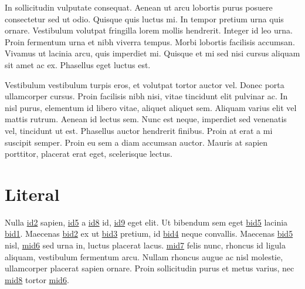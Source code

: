 \sphinxAtStartPar
In sollicitudin vulputate consequat. Aenean ut arcu lobortis purus posuere consectetur sed ut odio.
Quisque quis luctus mi. In tempor pretium urna quis ornare. Vestibulum volutpat fringilla lorem
mollis hendrerit. Integer id leo urna. Proin fermentum urna et nibh viverra tempus. Morbi lobortis
facilisis accumsan. Vivamus ut lacinia arcu, quis imperdiet mi. Quisque et mi sed nisi cursus
aliquam sit amet ac ex. Phasellus eget luctus est.

\sphinxAtStartPar
Vestibulum vestibulum turpis eros, et volutpat tortor auctor vel. Donec porta ullamcorper cursus.
Proin facilisis nibh nisi, vitae tincidunt elit pulvinar ac. In nisl purus, elementum id libero
vitae, aliquet aliquet sem. Aliquam varius elit vel mattis rutrum. Aenean id lectus sem. Nunc est
neque, imperdiet sed venenatis vel, tincidunt ut est. Phasellus auctor hendrerit finibus. Proin at
erat a mi suscipit semper. Proin eu sem a diam accumsan auctor. Mauris at sapien porttitor, placerat
erat eget, scelerisque lectus.


\section{Literal}
\label{\detokenize{test:literal}}\begin{sphinxalltt}
Nulla \hyperlink{\detokenize{id2}}{id2} sapien, \hyperlink{\detokenize{id5}}{id5} a
\hyperlink{\detokenize{id8}}{id8} id, \hyperlink{\detokenize{id9}}{id9} eget elit. \hypertarget{\detokenize{id10}}{Ut}
bibendum sem eget \hyperlink{\detokenize{bid5-ref32}}{\hypertarget{\detokenize{bid5}}{bid5}} lacinia \hyperlink{\detokenize{bid1}}{\hypertarget{\detokenize{bid1-ref28}}{bid1}}. Maecenas
\hyperlink{\detokenize{bid2}}{\hypertarget{\detokenize{bid2-ref29}}{bid2}} ex
ut \hyperlink{\detokenize{bid3}}{\hypertarget{\detokenize{bid3-ref30}}{bid3}} pretium, id \hyperlink{\detokenize{bid4}}{\hypertarget{\detokenize{bid4-ref31}}{bid4}} neque convallis. Maecenas
\hyperlink{\detokenize{bid5}}{\hypertarget{\detokenize{bid5-ref32}}{bid5}} nisl, \hyperlink{\detokenize{test-mid6-id1}}{\hypertarget{\detokenize{test-mid6-id0}}{mid6}} sed urna in, luctus placerat
lacus. \hyperlink{\detokenize{test-mid7-id0}}{\hypertarget{\detokenize{test-mid7-id1}}{mid7}} felis nunc, rhoncus id ligula aliquam, vestibulum fermentum arcu. Nullam rhoncus augue
ac nisl molestie, ullamcorper placerat sapien ornare. Proin sollicitudin purus et metus varius, nec
\hyperlink{\detokenize{test-mid8-id1}}{\hypertarget{\detokenize{test-mid8-id0}}{mid8}} tortor \hyperlink{\detokenize{test-mid6-id0}}{\hypertarget{\detokenize{test-mid6-id1}}{mid6}}.
\end{sphinxalltt}

